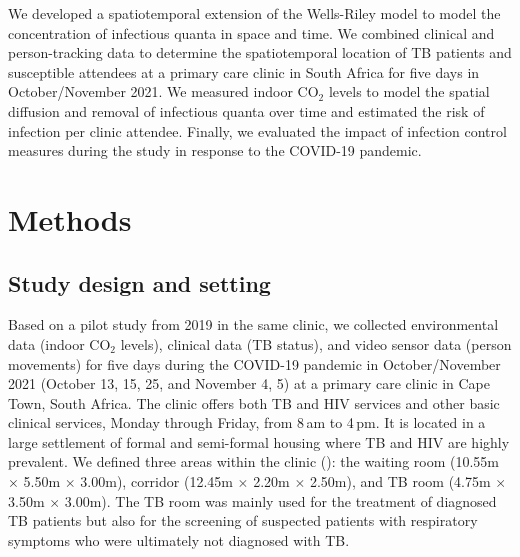 \documentclass[fleqn,11pt]{wlscirep}
\begin{document}
We developed a spatiotemporal extension of the Wells-Riley model to model the concentration of infectious quanta in space and time. We combined clinical and person-tracking data to determine the spatiotemporal location of TB patients and susceptible attendees at a primary care clinic in South Africa for five days in October/November 2021. We measured indoor CO$_2$ levels to model the spatial diffusion and removal of infectious quanta over time and estimated the risk of infection per clinic attendee. Finally, we evaluated the impact of infection control measures during the study in response to the COVID-19 pandemic.

\newpage

\section*{Methods}

\subsection*{Study design and setting}

Based on a pilot study from 2019 in the same clinic\cite{Zurcher2022JID,Zurcher2020BMJ}, we collected environmental data (indoor CO$_2$ levels), clinical data (TB status), and video sensor data (person movements) for five days during the COVID-19 pandemic in October/November 2021 (October 13, 15, 25, and November 4, 5) at a primary care clinic in Cape Town, South Africa. The clinic offers both TB and HIV services and other basic clinical services, Monday through Friday, from 8\,am to 4\,pm. It is located in a large settlement of formal and semi-formal housing where TB and HIV are highly prevalent\cite{Wood2007AMJRCCD,Middelkoop2011JAIDS}. We defined three areas within the clinic (): the waiting room (10.55m $\times$ 5.50m $\times$ 3.00m), corridor (12.45m $\times$ 2.20m $\times$ 2.50m), and TB room (4.75m $\times$ 3.50m $\times$ 3.00m). The TB room was mainly used for the treatment of diagnosed TB patients but also for the screening of suspected patients with respiratory symptoms who were ultimately not diagnosed with TB. 
\end{document}
